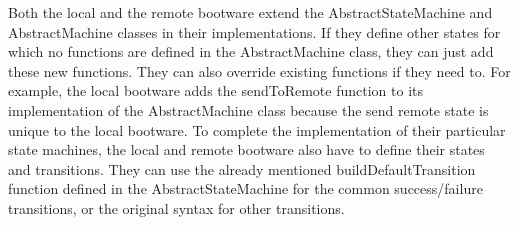 Both the local and the remote bootware extend the AbstractStateMachine and AbstractMachine classes in their implementations.
If they define other states for which no functions are defined in the AbstractMachine class, they can just add these new functions.
They can also override existing functions if they need to.
For example, the local bootware adds the sendToRemote function to its implementation of the AbstractMachine class because the send remote state is unique to the local bootware.
To complete the implementation of their particular state machines, the local and remote bootware also have to define their states and transitions.
They can use the already mentioned buildDefaultTransition function defined in the AbstractStateMachine for the common success/failure transitions, or the original syntax for other transitions.
